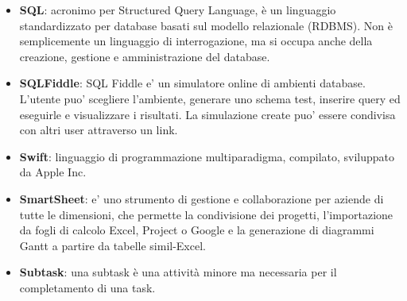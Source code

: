 \begin{itemize}
	\item \textbf{SQL}: acronimo per Structured Query Language, è un linguaggio standardizzato per database basati sul modello relazionale (RDBMS). Non è semplicemente un linguaggio di interrogazione, ma si occupa anche della creazione, gestione e amministrazione del database.
	\item \textbf{SQLFiddle}: SQL Fiddle e' un simulatore online di ambienti database. L'utente puo' scegliere l'ambiente, generare uno schema test, inserire query ed eseguirle e visualizzare i risultati. La simulazione create puo' essere condivisa con altri user attraverso un link.
	\item \textbf{Swift}: linguaggio di programmazione multiparadigma, compilato, sviluppato da Apple Inc.
	\item \textbf{SmartSheet}: e' uno strumento di gestione e collaborazione per aziende di tutte le dimensioni, che permette la condivisione dei progetti, l'importazione da fogli di calcolo Excel, Project o Google e la generazione di diagrammi Gantt a partire da tabelle simil-Excel.
	\item \textbf{Subtask}: una subtask è una attività minore ma necessaria per il completamento di una task.  
\end{itemize}